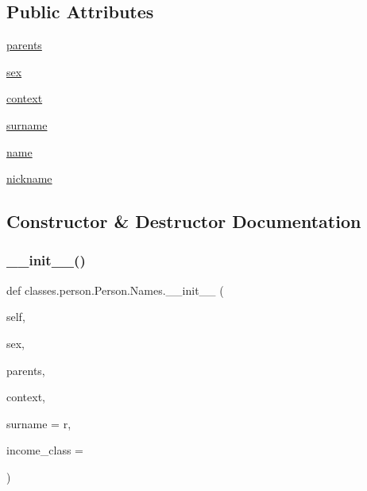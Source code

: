 \subsection*{Public Attributes}
\begin{DoxyCompactItemize}
\item 
\hyperlink{classclasses_1_1person_1_1Person_1_1Names_a63856a040505dcd495fe785eceabcfa6}{parents}
\item 
\hyperlink{classclasses_1_1person_1_1Person_1_1Names_a4a8c802683e259ab517153b317d8f74d}{sex}
\item 
\hyperlink{classclasses_1_1person_1_1Person_1_1Names_a094596e282a776850329d575cedd4147}{context}
\item 
\hyperlink{classclasses_1_1person_1_1Person_1_1Names_a8942bf5d3f1d5442338cf188052d003b}{surname}
\item 
\hyperlink{classclasses_1_1person_1_1Person_1_1Names_a0561843be2d95ad8e3ba71079f1631da}{name}
\item 
\hyperlink{classclasses_1_1person_1_1Person_1_1Names_adc52936d8a5be0d4ea6c2afa491dfd3a}{nickname}
\end{DoxyCompactItemize}


\subsection{Constructor \& Destructor Documentation}
\mbox{\label{classclasses_1_1person_1_1Person_1_1Names_ad445532c80f04e240c3e9744a4a72ab2}} 
\subsubsection{\texorpdfstring{\+\_\+\+\_\+init\+\_\+\+\_\+()}{\_\_init\_\_()}}
{\footnotesize\ttfamily def classes.\+person.\+Person.\+Names.\+\_\+\+\_\+init\+\_\+\+\_\+ (\begin{DoxyParamCaption}\item[{}]{self,  }\item[{}]{sex,  }\item[{}]{parents,  }\item[{}]{context,  }\item[{}]{surname = {\ttfamily \textquotesingle{}r\textquotesingle{}},  }\item[{}]{income\+\_\+class = {} }\end{DoxyParamCaption})}



